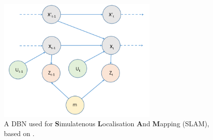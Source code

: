

\begin{figure}
    \includegraphics[width = 0.7\textwidth]{Chapters/BackgroundKnowledgeAndRelatedWork/MultiAgentTargetDetectionBackground/Figs/DBNs/Complex2TDBN.PNG}
    \caption{A DBN used for \textbf{S}imulatenous \textbf{L}ocalisation \textbf{A}nd \textbf{M}apping (SLAM), based on \cite[p.~311]{Thrun:2005:ProbabilisticRobotics}.}
    \label{fig:2TDBNExample}
\end{figure}

